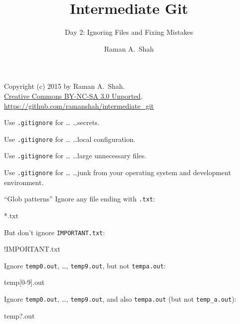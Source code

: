 

\title{Intermediate Git}
\subtitle{Day 2: Ignoring Files and Fixing Mistakes}
\author{Raman A.~Shah}
\date{}



\begin{frame}[plain]
  \titlepage
  \footnotesize{Copyright (c) 2015 by Raman A.~Shah.\\
  \href{https://creativecommons.org/licenses/by-nc-sa/3.0/legalcode}
       {Creative Commons BY-NC-SA 3.0 Unported}.\\
   \href{https://github.com/ramanshah/intermediate\_git}
        {https://github.com/ramanshah/intermediate\_git}}
\end{frame}

\begin{frame}{Use \texttt{.gitignore} for \ldots}
  \hangindent=26pt \huge {
  \ldots secrets.
  }
\end{frame}

\begin{frame}{Use \texttt{.gitignore} for \ldots}
  \hangindent=26pt \huge {
  \ldots local configuration.
  }
\end{frame}

\begin{frame}{Use \texttt{.gitignore} for \ldots}
  \hangindent=26pt \huge {
  \ldots large unnecessary files.
  }
\end{frame}

\begin{frame}{Use \texttt{.gitignore} for \ldots}
  \hangindent=26pt \huge {
  \ldots junk from your operating system and development environment.
  }
\end{frame}

\begin{frame}[fragile]{``Glob patterns''}
  Ignore any file ending with \texttt{.txt}:

  \begin{gitCommand}*.txt\end{gitCommand}

  But don't ignore \texttt{IMPORTANT.txt}:

  \begin{gitCommand}!IMPORTANT.txt\end{gitCommand}

  Ignore \texttt{temp0.out}, \ldots, \texttt{temp9.out}, but not
  \texttt{tempa.out}:

  \begin{gitCommand}temp[0-9].out\end{gitCommand}

  Ignore \texttt{temp0.out}, \ldots, \texttt{temp9.out}, and also
  \texttt{tempa.out} (but not \texttt{temp\_a.out}):

  \begin{gitCommand}temp?.out\end{gitCommand}
\end{frame}

